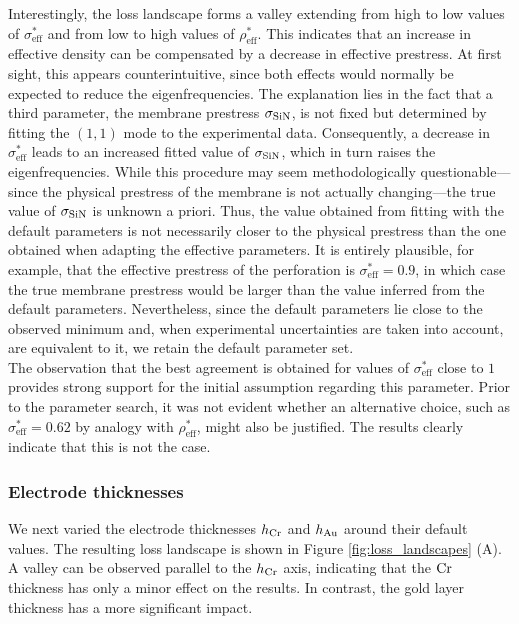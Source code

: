 Interestingly, the loss landscape forms a valley extending from high to low values of $\sigma_\mathrm{eff}^*$ and from low to high values of $\rho_\mathrm{eff}^*$. This indicates that an increase in effective density can be compensated by a decrease in effective prestress. At first sight, this appears counterintuitive, since both effects would normally be expected to reduce the eigenfrequencies. The explanation lies in the fact that a third parameter, the membrane prestress $\sigma_{\mathrm{SiN}}$, is not fixed but determined by fitting the $(1,1)$ mode to the experimental data. Consequently, a decrease in $\sigma_\mathrm{eff}^*$ leads to an increased fitted value of $\sigma_{\mathrm{SiN}}$, which in turn raises the eigenfrequencies. While this procedure may seem methodologically questionable—since the physical prestress of the membrane is not actually changing—the true value of $\sigma_{\mathrm{SiN}}$ is unknown a priori. Thus, the value obtained from fitting with the default parameters is not necessarily closer to the physical prestress than the one obtained when adapting the effective parameters. It is entirely plausible, for example, that the effective prestress of the perforation is $\sigma_\mathrm{eff}^*=0.9$, in which case the true membrane prestress would be larger than the value inferred from the default parameters. Nevertheless, since the default parameters lie close to the observed minimum and, when experimental uncertainties are taken into account, are equivalent to it, we retain the default parameter set.\\


The observation that the best agreement is obtained for values of $\sigma_\mathrm{eff}^*$ close to $1$ provides strong support for the initial assumption regarding this parameter. Prior to the parameter search, it was not evident whether an alternative choice, such as $\sigma_\mathrm{eff}^*=0.62$ by analogy with $\rho_\mathrm{eff}^*$, might also be justified. The results clearly indicate that this is not the case.\\


\subsubsection{Electrode thicknesses}

We next varied the electrode thicknesses $h_{\mathrm{Cr}}$ and $h_{\mathrm{Au}}$ around their default values. The resulting loss landscape is shown in Figure \ref{fig:loss_landscapes} (A). A valley can be observed parallel to the $h_{\mathrm{Cr}}$ axis, indicating that the $\mathrm{Cr}$ thickness has only a minor effect on the results. In contrast, the gold layer thickness has a more significant impact.\\


